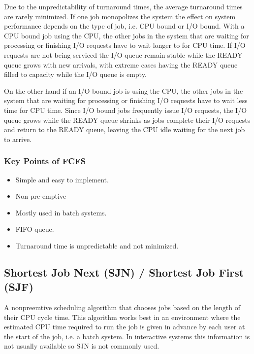 \documentclass[12pt letter]{report}
\begin{document}
Due to the unpredictability of turnaround times, the average
turnaround times are rarely minimized. If one job monopolizes the
system the effect on system performance depends on the type of job,
i.e. CPU bound or I/O bound. With a CPU bound job using the  CPU, the
other jobs in the system that are waiting for processing or finishing
I/O requests have to wait longer to for CPU time. If I/O requests are
not being serviced the I/O queue remain stable while the READY queue
grows with new arrivals, with extreme cases having the READY queue
filled to capacity while the I/O queue is empty.

On the other hand if an I/O bound job is using the CPU, the other
jobs in the system that are waiting for processing or finishing I/O
requests have to wait less time for CPU time. Since I/O bound jobs
frequently issue I/O requests, the I/O queue grows while the READY
queue shrinks as jobs complete their I/O requests and return to the
READY queue, leaving the CPU idle waiting for the next job to arrive.

\subsubsection{Key Points of FCFS}
\begin{itemize}
  \item Simple and easy to implement.
  \item Non pre-emptive
  \item Mostly used in batch systems.
  \item FIFO queue.
  \item Turnaround time is unpredictable and not minimized.
\end{itemize}

\subsection{Shortest Job Next (SJN) / Shortest Job First (SJF)  }

A nonpreemtive scheduling algorithm that chooses jobs based on the
length of their CPU cycle time. This algorithm works best in an
environment where the estimated CPU time required to run the job is
given in advance by each user at the start of the job, i.e. a batch
system. In interactive systems this information is not usually
available so SJN is not commonly used.
\end{document}
